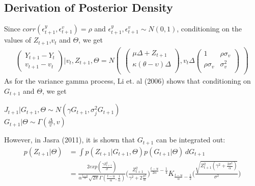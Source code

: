 \documentclass[11pt]{article}
\theoremstyle{definition}
\begin{document}
\subsection{Derivation of Posterior Density}
Since $corr(\epsilon_{t+1}^{y},\epsilon_{t+1}^{v})=\rho$ and $\epsilon_{t+1}^{y},\epsilon_{t+1}^{v} \sim N(0,1)$, conditioning on the values of $Z_{t+1}$,$v_{t}$ and $\Theta$, we get
\begin{equation}
	\begin{aligned}
\begin{pmatrix}
Y_{t+1} - Y_{t}\\
v_{t+1} - v_{t}
\end{pmatrix} | v_{t},Z_{t+1},\Theta
= 
N
\begin{pmatrix}
\begin{pmatrix}
\mu \Delta + Z_{t+1} \\
\kappa (\theta - \upsilon) \Delta \\
\end{pmatrix}
,
v_{t} \Delta
\begin{pmatrix}
1 & \rho \sigma_{v} \\
\rho \sigma_{v} & \sigma_{v}^2 \\
\end{pmatrix}
\end{pmatrix}
	\end{aligned}
\end{equation}
As for the variance gamma process, Li et. al (2006) shows that conditioning on $G_{t+1}$ and $\Theta$, we get \\
\begin{center}
$J_{t+1} | G_{t+1},\Theta \sim N(\gamma G_{t+1},\sigma_{j}^{2}G_{t+1})$ \\
$G_{t+1} | \Theta \sim \Gamma(\frac{\Delta}{v},v)$\\
\end{center}
However, in Jasra (2011), it is shown that $G_{t+1}$ can be integrated out:
\begin{equation}
	\begin{aligned}
		p(Z_{t+1}|\Theta) &= \int p(Z_{t+1}|G_{t+1},\Theta)p(G_{t+1}|\Theta) \,dG_{t+1}\\
		&= \frac{2exp(\frac{\gamma Z_{t+1}^{2}}{\sigma})}{\alpha^{\frac{t-u}{\alpha}}\sqrt{2\pi} \Gamma(\frac{t-u}{\alpha},\frac{1}{\alpha})}\Bigg(\frac{Z_{t+1}^{2}}{\gamma^{2}+2\frac{\sigma^{2}}{\alpha}}\Bigg)^{\frac{t-u}{2\alpha}-\frac{1}{4}}K_{\frac{t-u}{\alpha}-\frac{1}{2}}\Bigg(\frac{\sqrt{Z_{t+1}^{2}(\gamma^{2}+\frac{2\sigma^{2}}{\alpha})}}{\sigma^{2}}\Bigg)
	\end{aligned}
\end{equation}
\end{document}

